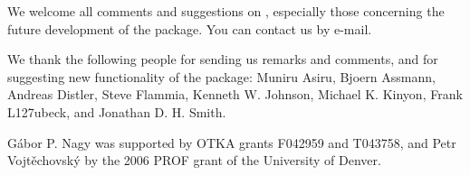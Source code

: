 
We welcome all comments and suggestions on {\LOOPS}, especially those
concerning the future development of the package. You can contact us by e-mail.


We thank the following people for sending us remarks and comments, and for
suggesting new functionality of the package: Muniru Asiru, Bjoern Assmann,
Andreas Distler, Steve Flammia, Kenneth W. Johnson, Michael K. Kinyon, Frank
L\accent127ubeck, and Jonathan D. H. Smith.

G\'abor P. Nagy was supported by OTKA grants F042959 and T043758, and Petr
Vojt\v{e}chovsk\'y by the 2006 PROF grant of the University of Denver.
